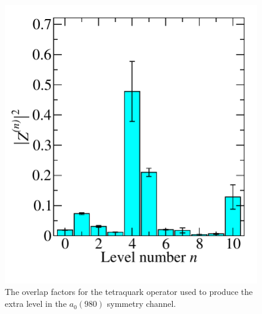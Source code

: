 \begin{figure}
  \includegraphics[scale=0.5]{figures/zfactors_a1gm/zfactor_uudu3m_SS_3.pdf}
  \caption{The overlap factors for the tetraquark operator used to produce the extra level in the $a_0(980)$ symmetry channel.}\label{fig:za0}
\end{figure}